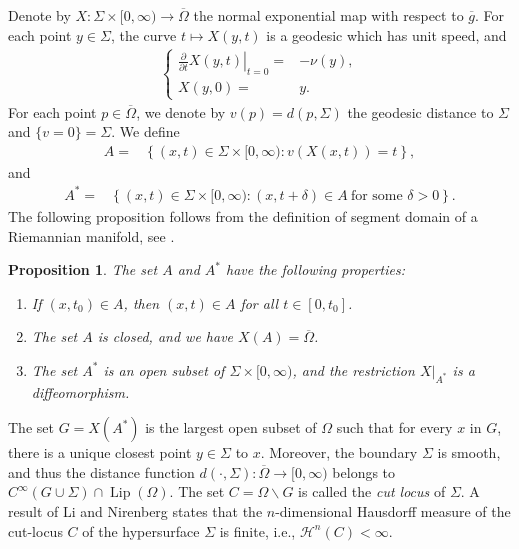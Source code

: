 \documentclass[11pt,reqno]{amsart}
\newtheorem{prop}[thm]{Proposition}
\theoremstyle{definition}
\theoremstyle{remark}
\numberwithin{equation}{section}
\renewcommand{\(}{\left(}
\renewcommand{\)}{\right)}
\renewcommand{\~}{\widetilde}
\renewcommand{\-}{\overline}
\renewcommand{\d}{\delta}
\newcommand{\ra}{\rightarrow}
\begin{document}
Denote by $X:\Sigma\times [0,\infty)\ra \-\Omega$ the normal exponential map with respect to $\-g$. For each point $y\in \Sigma$, the curve $t \mapsto X(y,t)$ is a geodesic which has unit speed, and
\begin{align}\label{s2:unit-normal-flow}
\left\{\begin{aligned}
\left.\frac{\partial}{\partial t}X(y,t)\right|_{t=0}=&-\nu(y),\\
X(y,0)=&y.
\end{aligned}\right.
\end{align}
For each point $p\in \-\Omega$, we denote by $v(p)=d(p,\Sigma)$ the geodesic distance to $\Sigma$ and $\{v=0\}=\Sigma$.  We define
\begin{align*}
A=&\left\{(x,t)\in \Sigma\times [0,\infty):v(X(x,t))=t\right\},
\end{align*}
and
\begin{align*}
A^\ast=&\left\{(x,t)\in \Sigma\times [0,\infty):(x,t+\d)\in A ~\text{for some $\d>0$}\right\}.
\end{align*}
The following proposition follows from the definition of segment domain of a Riemannian manifold, see \cite[Proposition 3.1]{Bre13}.
\begin{prop}\cite{Bre13}
	The set $A$ and $A^\ast$ have the following properties:
	\begin{enumerate}[$(i)$]
		\item If $(x,t_0)\in A$, then $(x,t)\in A$ for all $t\in [0,t_0]$.
		\item The set $A$ is closed, and we have $X(A)=\-\Omega$.
		\item The set $A^\ast$ is an open subset of $\Sigma\times [0,\infty)$, and the restriction $X|_{A^\ast}$ is a diffeomorphism.
	\end{enumerate}
\end{prop}
The set $G=X(A^\ast)$ is the largest open subset of $\Omega$ such that for every $x$ in $G$, there is a unique closest point $y\in \Sigma$ to $x$. Moreover, the boundary $\Sigma$ is smooth, and thus the distance function $d(\cdot,\Sigma):\-\Omega \ra [0,\infty)$ belongs to $C^{\infty}(G\cup \Sigma)\cap \operatorname{Lip}(\Omega)$. The set $C=\Omega\backslash G$ is called the {\em cut locus} of $\Sigma$. A result of Li and Nirenberg \cite[Corollary 1.6]{Li-Nirenberg2005} states that the $n$-dimensional Hausdorff measure of the cut-locus $C$ of the hypersurface $\Sigma$ is finite, i.e., $\mathcal{H}^{n}(C)<\infty$.
\end{document}
